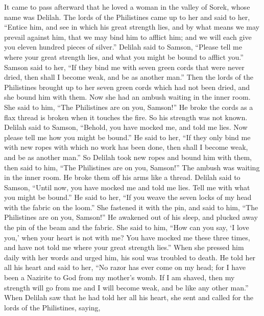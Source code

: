  It came to pass afterward that he loved a woman in the
valley of Sorek, whose name was Delilah.  The lords of the
Philistines came up to her and said to her, ``Entice him, and see in
which his great strength lies, and by what means we may prevail against
him, that we may bind him to afflict him; and we will each give you
eleven hundred pieces of silver.''  Delilah said to
Samson, ``Please tell me where your great strength lies, and what you
might be bound to afflict you.''  Samson said to her, ``If
they bind me with seven green cords that were never dried, then shall I
become weak, and be as another man.''  Then the lords of
the Philistines brought up to her seven green cords which had not been
dried, and she bound him with them.  Now she had an ambush
waiting in the inner room. She said to him, ``The Philistines are on
you, Samson!'' He broke the cords as a flax thread is broken when it
touches the fire. So his strength was not known.  Delilah
said to Samson, ``Behold, you have mocked me, and told me lies. Now
please tell me how you might be bound.''  He said to her,
``If they only bind me with new ropes with which no work has been done,
then shall I become weak, and be as another man.''  So
Delilah took new ropes and bound him with them, then said to him, ``The
Philistines are on you, Samson!'' The ambush was waiting in the inner
room. He broke them off his arms like a thread.  Delilah
said to Samson, ``Until now, you have mocked me and told me lies. Tell
me with what you might be bound.'' He said to her, ``If you weave the
seven locks of my head with the fabric on the loom.'' 
She fastened it with the pin, and said to him, ``The Philistines are on
you, Samson!'' He awakened out of his sleep, and plucked away the pin of
the beam and the fabric.  She said to him, ``How can you
say, `I love you,' when your heart is not with me? You have mocked me
these three times, and have not told me where your great strength
lies.''  When she pressed him daily with her words and
urged him, his soul was troubled to death.  He told her
all his heart and said to her, ``No razor has ever come on my head; for
I have been a Nazirite to God from my mother's womb. If I am shaved,
then my strength will go from me and I will become weak, and be like any
other man.''  When Delilah saw that he had told her all
his heart, she sent and called for the lords of the Philistines, saying,
